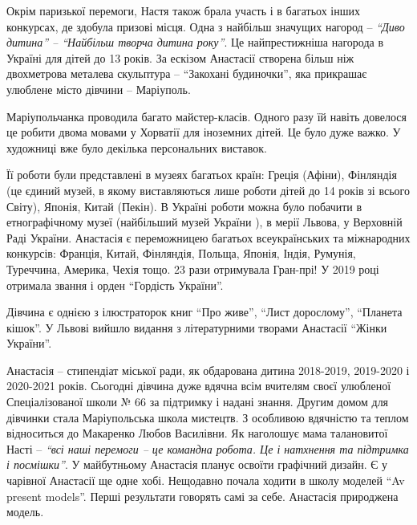 Окрім паризької перемоги, Настя також брала участь і в багатьох інших
конкурсах, де здобула призові місця. Одна з найбільш значущих нагород – \emph{\enquote{Диво
дитина} – \enquote{Найбільш творча дитина року}}. Це найпрестижніша нагорода в Україні
для дітей до 13 років. За ескізом Анастасії створена більш ніж двохметрова
металева скульптура – \enquote{Закохані будиночки}, яка прикрашає улюблене місто
дівчини – Маріуполь.

Маріупольчанка проводила багато майстер-класів. Одного разу їй навіть довелося
це робити двома мовами у Хорватії для іноземних дітей. Це було дуже важко. У
художниці вже було декілька персональних виставок.


Її роботи були представлені в музеях багатьох країн: Греція (Афіни), Фінляндія
(це єдиний музей, в якому виставляються лише роботи дітей до 14 років зі всього
Світу), Японія, Китай (Пекін). В Україні роботи можна було побачити в
етнографічному музеї (найбільший музей України ), в мерії Львова, у Верховній
Раді України. Анастасія є переможницею багатьох всеукраїнських та міжнародних
конкурсів: Франція, Китай, Фінляндія, Польща, Японія, Індія, Румунія,
Туреччина, Америка, Чехія тощо. 23 рази отримувала Гран-прі! У 2019 році
отримала звання і орден \enquote{Гордість України}.

Дівчина є однією з ілюстраторок книг \enquote{Про живе}, \enquote{Лист дорослому},  \enquote{Планета
кішок}. У Львові вийшло видання з літературними творами Анастасії \enquote{Жінки
України}.


Анастасія – стипендіат міської ради, як обдарована дитина 2018-2019, 2019-2020
і 2020-2021 років. Сьогодні дівчина дуже вдячна всім вчителям своєї улюбленої
Спеціалізованої школи № 66 за підтримку і надані знання. Другим домом для
дівчинки стала Маріупольська школа мистецтв. З особливою вдячністю та теплом
відноситься до Макаренко Любов Василівни. Як наголошує мама талановитої Насті –
\emph{\enquote{всі наші перемоги – це командна робота. Це і натхнення та підтримка і
посмішки}}. У майбутньому Анастасія планує освоїти графічний дизайн. Є у
чарівної Анастасії ще одне хобі. Нещодавно почала ходити в школу моделей \enquote{Av
present models}. Перші результати говорять самі за себе. Анастасія природжена
модель.


